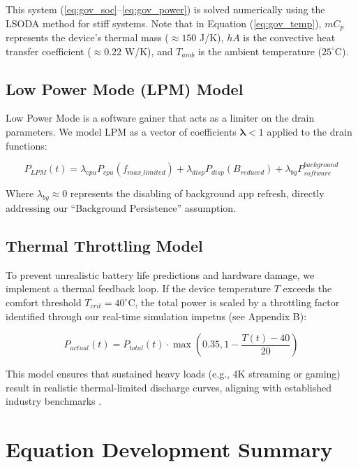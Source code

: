 \documentclass[12pt]{article}
\begin{document}
This system (\ref{eq:gov_soc}--\ref{eq:gov_power}) is solved numerically using the LSODA method for stiff systems. Note that in Equation (\ref{eq:gov_temp}), $m C_p$ represents the device's thermal mass ($\approx 150$ J/K), $h A$ is the convective heat transfer coefficient ($\approx 0.22$ W/K), and $T_{amb}$ is the ambient temperature ($25^\circ$C).

\subsection{Low Power Mode (LPM) Model}

Low Power Mode is a software gainer that acts as a limiter on the drain parameters. We model LPM as a vector of coefficients $\mathbf{\lambda} < 1$ applied to the drain functions:

\begin{equation} \label{eq:lpm_power}
P_{LPM}(t) = \lambda_{cpu} P_{cpu}(f_{max\_limited}) + \lambda_{disp} P_{disp}(B_{reduced}) + \lambda_{bg} P_{software}^{background}
\end{equation}

Where $\lambda_{bg} \approx 0$ represents the disabling of background app refresh, directly addressing our ``Background Persistence'' assumption.

\subsection{Thermal Throttling Model}

To prevent unrealistic battery life predictions and hardware damage, we implement a thermal feedback loop. If the device temperature $T$ exceeds the comfort threshold $T_{crit} = 40^\circ$C, the total power is scaled by a throttling factor identified through our real-time simulation impetus (see Appendix B):

\begin{equation} \label{eq:thermal_throttle}
P_{actual}(t) = P_{total}(t) \cdot \max \left( 0.35, 1 - \frac{T(t) - 40}{20} \right)
\end{equation}

This model ensures that sustained heavy loads (e.g., 4K streaming or gaming) result in realistic thermal-limited discharge curves, aligning with established industry benchmarks \cite{14}.

\section{Equation Development Summary}
\end{document}
